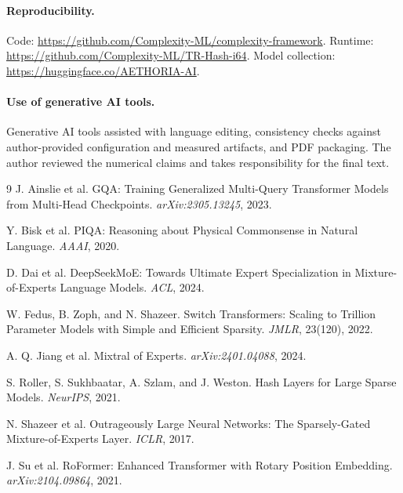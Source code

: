 \documentclass[10pt,twocolumn]{article}
\begin{document}
\paragraph{Reproducibility.}
Code: \url{https://github.com/Complexity-ML/complexity-framework}. Runtime: \url{https://github.com/Complexity-ML/TR-Hash-i64}. Model collection: \url{https://huggingface.co/AETHORIA-AI}.

\paragraph{Use of generative AI tools.}
Generative AI tools assisted with language editing, consistency checks against author-provided configuration and measured artifacts, and PDF packaging. The author reviewed the numerical claims and takes responsibility for the final text.

\begin{thebibliography}{9}
J. Ainslie et al. GQA: Training Generalized Multi-Query Transformer Models from Multi-Head Checkpoints. \emph{arXiv:2305.13245}, 2023.

Y. Bisk et al. PIQA: Reasoning about Physical Commonsense in Natural Language. \emph{AAAI}, 2020.

D. Dai et al. DeepSeekMoE: Towards Ultimate Expert Specialization in Mixture-of-Experts Language Models. \emph{ACL}, 2024.

W. Fedus, B. Zoph, and N. Shazeer. Switch Transformers: Scaling to Trillion Parameter Models with Simple and Efficient Sparsity. \emph{JMLR}, 23(120), 2022.

\newpage

A. Q. Jiang et al. Mixtral of Experts. \emph{arXiv:2401.04088}, 2024.

S. Roller, S. Sukhbaatar, A. Szlam, and J. Weston. Hash Layers for Large Sparse Models. \emph{NeurIPS}, 2021.

N. Shazeer et al. Outrageously Large Neural Networks: The Sparsely-Gated Mixture-of-Experts Layer. \emph{ICLR}, 2017.

J. Su et al. RoFormer: Enhanced Transformer with Rotary Position Embedding. \emph{arXiv:2104.09864}, 2021.
\end{thebibliography}
\end{document}
